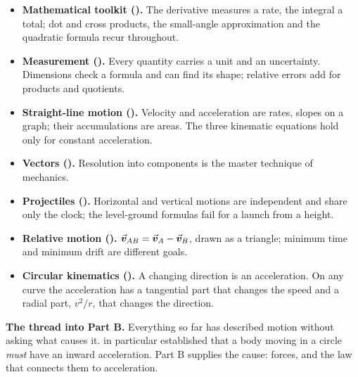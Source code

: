 \begin{itemize}
\item \textbf{Mathematical toolkit ().} The derivative measures a rate, the integral a
      total; dot and cross products, the small-angle approximation and the quadratic formula recur
      throughout.
\item \textbf{Measurement ().} Every quantity carries a unit and an uncertainty. Dimensions check a
      formula and can find its shape; relative errors add for products and quotients.
\item \textbf{Straight-line motion ().} Velocity and acceleration are rates, slopes on a graph; their
      accumulations are areas. The three kinematic equations hold only for constant acceleration.
\item \textbf{Vectors ().} Resolution into components is the master technique of mechanics.
\item \textbf{Projectiles ().} Horizontal and vertical motions are independent and
      share only the clock; the level-ground formulas fail for a launch from a height.
\item \textbf{Relative motion ().} $\vec{\bm{v}}_{AB}=\vec{\bm{v}}_A-\vec{\bm{v}}_B$, drawn as a triangle;
      minimum time and minimum drift are different goals.
\item \textbf{Circular kinematics ().} A changing direction is an acceleration. On any curve the
      acceleration has a tangential part that changes the speed and a radial part, $v^2/r$, that changes the
      direction.
\end{itemize}

\noindent\textbf{The thread into Part B.} Everything so far has described motion without asking what causes
it.  in particular established that a body moving in a circle \emph{must} have an inward
acceleration. Part B supplies the cause: forces, and the law that connects them to acceleration.
